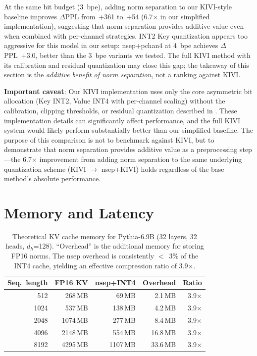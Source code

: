 \documentclass[11pt]{article}
\begin{document}
At the same bit budget (3~bpe), adding norm separation to our KIVI-style baseline improves $\Delta$PPL from~+361 to~+54 (6.7$\times$ in our simplified implementation), suggesting that norm separation provides additive value even when combined with per-channel strategies. INT2 Key quantization appears too aggressive for this model in our setup: nsep+pchan4 at 4~bpe achieves $\Delta$PPL~+3.0, better than the 3~bpe variants we tested. The full KIVI method with its calibration and residual quantization may close this gap; the takeaway of this section is the \emph{additive benefit of norm separation}, not a ranking against KIVI.

\textbf{Important caveat}: Our KIVI implementation uses only the core asymmetric bit allocation (Key INT2, Value INT4 with per-channel scaling) without the calibration, clipping thresholds, or residual quantization described in \citet{liu2024kivi}. These implementation details can significantly affect performance, and the full KIVI system would likely perform substantially better than our simplified baseline. The purpose of this comparison is not to benchmark against KIVI, but to demonstrate that norm separation provides additive value as a preprocessing step---the 6.7$\times$ improvement from adding norm separation to the same underlying quantization scheme (KIVI $\to$ nsep+KIVI) holds regardless of the base method's absolute performance.

\section{Memory and Latency}

\begin{table}[h]
\centering
\small
\begin{tabular}{rrrrr}
\toprule
Seq.\ length & FP16 KV & nsep+INT4 & Overhead & Ratio \\
\midrule
512 & 268\,MB & 69\,MB & 2.1\,MB & 3.9$\times$ \\
1024 & 537\,MB & 138\,MB & 4.2\,MB & 3.9$\times$ \\
2048 & 1074\,MB & 277\,MB & 8.4\,MB & 3.9$\times$ \\
4096 & 2148\,MB & 554\,MB & 16.8\,MB & 3.9$\times$ \\
8192 & 4295\,MB & 1107\,MB & 33.6\,MB & 3.9$\times$ \\
\bottomrule
\end{tabular}
\caption{Theoretical KV cache memory for Pythia-6.9B (32 layers, 32 heads, $d_h$=128). ``Overhead'' is the additional memory for storing FP16 norms. The nsep overhead is consistently $<$~3\% of the INT4 cache, yielding an effective compression ratio of 3.9$\times$.}
\label{tab:memory}
\end{table}
\end{document}
